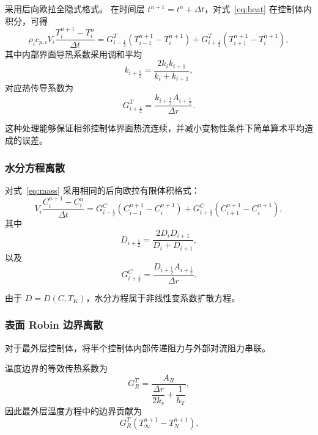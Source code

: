 \documentclass[UTF8,a4paper,12pt]{ctexart}
\begin{document}
采用后向欧拉全隐式格式。
在时间层 $t^{n+1}=t^n+\Delta t$，对式~\eqref{eq:heat} 在控制体内积分，可得
\begin{equation}
\rho_i c_{p,i}V_i
\frac{T_i^{n+1}-T_i^n}{\Delta t}
=
G_{i-\frac12}^{T}
\left(T_{i-1}^{n+1}-T_i^{n+1}\right)
+
G_{i+\frac12}^{T}
\left(T_{i+1}^{n+1}-T_i^{n+1}\right),
\label{eq:heatfvm}
\end{equation}
其中内部界面导热系数采用调和平均
\begin{equation}
k_{i+\frac12}
=
\frac{2k_ik_{i+1}}{k_i+k_{i+1}},
\end{equation}
对应热传导系数为
\begin{equation}
G_{i+\frac12}^{T}
=
\frac{k_{i+\frac12}A_{i+\frac12}}{\Delta r}.
\end{equation}

这种处理能够保证相邻控制体界面热流连续，并减小变物性条件下简单算术平均造成的误差。

\subsubsection{水分方程离散}

对式~\eqref{eq:mass} 采用相同的后向欧拉有限体积格式：
\begin{equation}
V_i
\frac{C_i^{n+1}-C_i^n}{\Delta t}
=
G_{i-\frac12}^{C}
\left(C_{i-1}^{n+1}-C_i^{n+1}\right)
+
G_{i+\frac12}^{C}
\left(C_{i+1}^{n+1}-C_i^{n+1}\right),
\label{eq:massfvm}
\end{equation}
其中
\begin{equation}
D_{i+\frac12}
=
\frac{2D_iD_{i+1}}{D_i+D_{i+1}},
\end{equation}
以及
\begin{equation}
G_{i+\frac12}^{C}
=
\frac{D_{i+\frac12}A_{i+\frac12}}{\Delta r}.
\end{equation}

由于 $D=D(C,T_K)$，水分方程属于非线性变系数扩散方程。

\subsubsection{表面 Robin 边界离散}

对于最外层控制体，将半个控制体内部传递阻力与外部对流阻力串联。

温度边界的等效传热系数为
\begin{equation}
G_R^T
=
\frac{A_R}
{\dfrac{\Delta r}{2k_s}+\dfrac{1}{h_T}},
\end{equation}
因此最外层温度方程中的边界贡献为
\begin{equation}
G_R^T
\left(
T_{\infty}^{n+1}-T_N^{n+1}
\right).
\end{equation}
\end{document}
